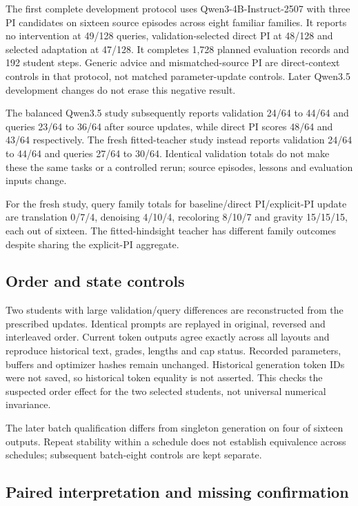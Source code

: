 \documentclass[11pt,letterpaper]{article}
\begin{document}
The first complete development protocol uses Qwen3-4B-Instruct-2507 with three PI candidates on sixteen source episodes across eight familiar families. It reports no intervention at 49/128 queries, validation-selected direct PI at 48/128 and selected adaptation at 47/128. It completes 1,728 planned evaluation records and 192 student steps. Generic advice and mismatched-source PI are direct-context controls in that protocol, not matched parameter-update controls. Later Qwen3.5 development changes do not erase this negative result.

The balanced Qwen3.5 study subsequently reports validation 24/64 to 44/64 and queries 23/64 to 36/64 after source updates, while direct PI scores 48/64 and 43/64 respectively. The fresh fitted-teacher study instead reports validation 24/64 to 44/64 and queries 27/64 to 30/64. Identical validation totals do not make these the same tasks or a controlled rerun; source episodes, lessons and evaluation inputs change.

For the fresh study, query family totals for baseline/direct PI/explicit-PI update are translation 0/7/4, denoising 4/10/4, recoloring 8/10/7 and gravity 15/15/15, each out of sixteen. The fitted-hindsight teacher has different family outcomes despite sharing the explicit-PI aggregate.

\subsection{Order and state controls}

Two students with large validation/query differences are reconstructed from the prescribed updates. Identical prompts are replayed in original, reversed and interleaved order. Current token outputs agree exactly across all layouts and reproduce historical text, grades, lengths and cap status. Recorded parameters, buffers and optimizer hashes remain unchanged. Historical generation token IDs were not saved, so historical token equality is not asserted. This checks the suspected order effect for the two selected students, not universal numerical invariance.

The later batch qualification differs from singleton generation on four of sixteen outputs. Repeat stability within a schedule does not establish equivalence across schedules; subsequent batch-eight controls are kept separate.

\subsection{Paired interpretation and missing confirmation}
\end{document}
